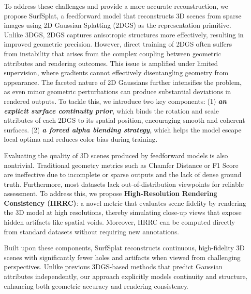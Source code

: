 To address these challenges and provide a more accurate reconstruction, we propose SurfSplat, a feedforward model that reconstructs 3D scenes from sparse images using 2D Gaussian Splatting (2DGS) as the representation primitive.
Unlike 3DGS, 2DGS captures anisotropic structures more effectively, resulting in improved geometric precision. 
However, direct training of 2DGS often suffers from instability that arises from the complex coupling between geometric attributes and rendering outcomes. This issue is amplified under limited supervision, where gradients cannot effectively disentangling geometry from appearance. The faceted nature of 2D Gaussians further intensifies the problem, as even minor geometric perturbations can produce substantial deviations in rendered outputs.
To tackle this, we introduce two key components: (1)
\textbf{\textit{an explicit surface continuity prior}}, which binds the rotation and scale attributes of each 2DGS to its spatial position, encouraging smooth and coherent surfaces. (2)
\textbf{\textit{a forced alpha blending strategy}}, which helps the model escape local optima and reduces color bias during training.

Evaluating the quality of 3D scenes produced by feedforward models is also nontrivial. Traditional geometry metrics such as Chamfer Distance or F1 Score are ineffective due to incomplete or sparse outputs and the lack of dense ground truth. Furthermore, most datasets lack out-of-distribution viewpoints for reliable assessment.
To address this, we propose \textbf{High-Resolution Rendering Consistency (HRRC)}: a novel metric that evaluates scene fidelity by rendering the 3D model at high resolutions, thereby simulating close-up views that expose hidden artifacts like spatial voids. Moreover, HRRC can be computed directly from standard datasets without requiring new annotations.

Built upon these components, SurfSplat reconstructs continuous, high-fidelity 3D scenes with significantly fewer holes and artifacts when viewed from challenging perspectives. Unlike previous 3DGS-based methods that predict Gaussian attributes independently, our approach explicitly models continuity and structure, enhancing both geometric accuracy and rendering consistency. 

